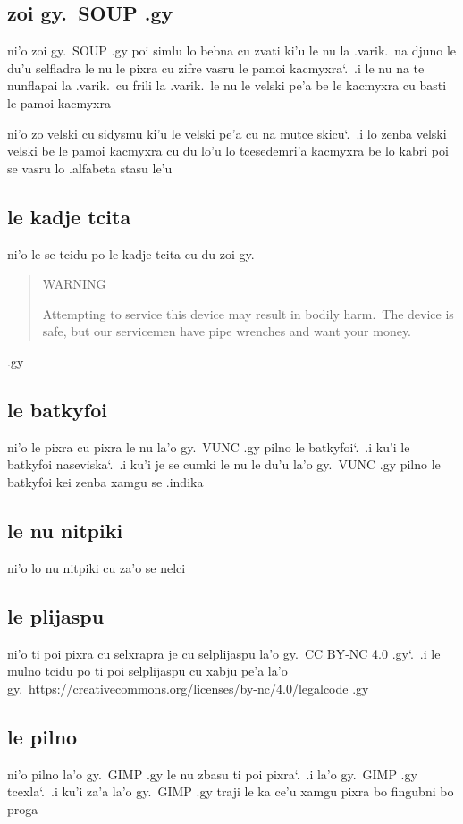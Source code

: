 \documentclass{report}
\newcommand\sds{\spacefactor\sfcode`.\ \space}
\begin{document}
\subsection{zoi gy.\ SOUP .gy}
ni'o zoi gy.\ SOUP .gy poi simlu lo bebna cu zvati ki'u le nu la .varik.\ na djuno le du'u selfladra le nu le pixra cu zifre vasru le pamoi kacmyxra\sds  .i le nu na te nunflapai la .varik.\ cu frili la .varik.\ le nu le velski pe'a be le kacmyxra cu basti le pamoi kacmyxra

ni'o zo velski cu sidysmu ki'u le velski pe'a cu na mutce skicu\sds  .i lo zenba velski velski be le pamoi kacmyxra cu du lo'u lo tcesedemri'a kacmyxra be lo kabri poi se vasru lo .alfabeta stasu le'u

\subsection{le kadje tcita}
ni'o le se tcidu po le kadje tcita cu du zoi gy.
\begin{quote}
	WARNING

	Attempting to service this device may result in bodily harm.\  The device is safe, but our servicemen have pipe wrenches and want your money.
\end{quote}
.gy

\subsection{le batkyfoi}
ni'o le pixra cu pixra le nu la'o gy.\ VUNC .gy pilno le batkyfoi\sds  .i ku'i le batkyfoi naseviska\sds  .i ku'i je se cumki le nu le du'u la'o gy.\ VUNC .gy pilno le batkyfoi kei zenba xamgu se .indika

\subsection{le nu nitpiki}
ni'o lo nu nitpiki cu za'o se nelci

\subsection{le plijaspu}
ni'o ti poi pixra cu selxrapra je cu selplijaspu la'o gy.\ CC BY-NC 4.0 .gy\sds .i le mulno tcidu po ti poi selplijaspu cu xabju pe'a la'o gy.\ https://creativecommons.org/licenses/by-nc/4.0/legalcode .gy

\subsection{le pilno}
ni'o pilno la'o gy.\ GIMP .gy le nu zbasu ti poi pixra\sds  .i la'o gy.\ GIMP .gy tcexla\sds  .i ku'i za'a la'o gy.\ GIMP .gy traji le ka ce'u xamgu pixra bo fingubni bo proga
\end{document}
